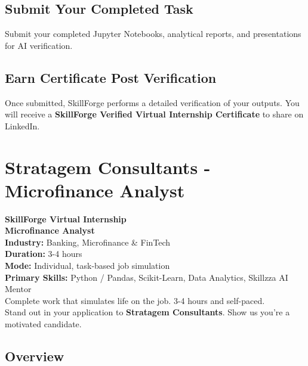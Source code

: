 \documentclass{article}
\begin{document}
\subsection*{Submit Your Completed Task}
Submit your completed Jupyter Notebooks, analytical reports, and presentations for AI verification.\\

\subsection*{Earn Certificate Post Verification}
Once submitted, SkillForge performs a detailed verification of your outputs. You will receive a \textbf{SkillForge Verified Virtual Internship Certificate} to share on LinkedIn.\\

\newpage

\section{Stratagem Consultants - Microfinance Analyst}

\textbf{SkillForge Virtual Internship} \\
\textbf{Microfinance Analyst} \\

\textbf{Industry:} Banking, Microfinance & FinTech \\
\textbf{Duration:} 3-4 hours \\
\textbf{Mode:} Individual, task-based job simulation \\
\textbf{Primary Skills:} Python / Pandas, Scikit-Learn, Data Analytics, Skillzza AI Mentor \\

Complete work that simulates life on the job. 3-4 hours and self-paced. \\
Stand out in your application to \textbf{Stratagem Consultants}. Show us you're a motivated candidate. \\

\subsection*{Overview}
\end{document}
